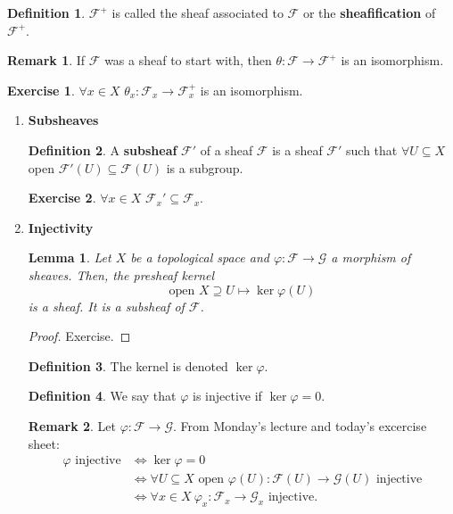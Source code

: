 \documentclass[12pt]{article}
\newtheorem*{lemma}{Lemma}
\theoremstyle{definition}
\newtheorem*{definition}{Definition}
\newtheorem*{remark}{Remark}
\newtheorem*{exercise}{Exercise}
\begin{document}
\begin{definition}
$\mathcal F^+$ is called the sheaf associated to $\mathcal F$ or the \textbf{sheafification} of $\mathcal F^+$.
\end{definition}

\begin{remark}
If $\mathcal F$ was a sheaf to start with, then $\theta:\mathcal F\rightarrow\mathcal F^+$ is an isomorphism.
\end{remark}

\begin{exercise}
$\forall x\in X$ $\theta_x:\mathcal F_x\rightarrow\mathcal F^+_x$ is an isomorphism.
\end{exercise}

\begin{enumerate}[label=\arabic*)]
\item \textbf{Subsheaves}
\begin{definition}
A \textbf{subsheaf} $\mathcal F'$ of a sheaf $\mathcal F$ is a sheaf $\mathcal F'$ such that $\forall U\subseteq X$ open $\mathcal F'(U)\subseteq\mathcal F(U)$ is a subgroup.
\end{definition}

\begin{exercise}
$\forall x\in X$ $\mathcal F_x'\subseteq\mathcal F_x$.
\end{exercise}

\item \textbf{Injectivity}
\begin{lemma}
Let $X$ be a topological space and $\varphi:\mathcal F\rightarrow\mathcal G$ a morphism of sheaves. Then, the presheaf kernel
\[\text{open }X\supseteq U\longmapsto\ker\varphi(U)\]
is a sheaf. It is a subsheaf of $\mathcal F$.
\end{lemma}

\begin{proof}
Exercise.
\end{proof}

\begin{definition}
The kernel is denoted $\ker\varphi$.
\end{definition}

\begin{definition}
We say that $\varphi$ is injective if $\ker\varphi=0$.
\end{definition}

\begin{remark}
Let $\varphi:\mathcal F\rightarrow\mathcal G$. From Monday's lecture and today's excercise sheet:
\begin{align*}
\varphi\text{ injective}&\Longleftrightarrow\ker\varphi=0\\&\Longleftrightarrow\forall U\subseteq X\text{ open }\varphi(U):\mathcal F(U)\rightarrow\mathcal G(U)\text{ injective}\\&\Longleftrightarrow\forall x\in X\ \varphi_x:\mathcal F_x\rightarrow\mathcal G_x\text{ injective}.
\end{align*}
\end{remark}


\end{enumerate}
\end{document}

